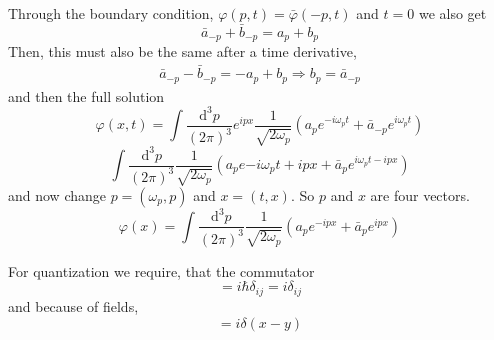 \documentclass[]{scrartcl}
\begin{document}
Through the boundary condition, $\varphi(p,t) = \bar\varphi(-p,t)$ and $t = 0$ we also get
\begin{equation}
	\bar a_{-p} + \bar b_{-p} = a_p + b_p
\end{equation}
Then, this must also be the same after a time derivative,
\begin{gather}
	\bar a_{-p} - \bar b_{-p} = - a_p + b_p
	\Rightarrow b_p = \bar a_{-p}
\end{gather}
and then the full solution
\begin{equation}
	\varphi(x,t) = \int \frac{\text{d}^3p}{(2\pi)^3} e^{ipx}\frac{1}{\sqrt{2\omega_p}}\left(a_pe^{-i\omega_p t} + \bar a_{-p} e^{i\omega_p t}\right)
\end{equation}
\begin{equation}
	\int \frac{\text{d}^3 p}{(2\pi)^3}\frac{1}{\sqrt{2\omega_p}}\left(a_p e{-i\omega_p t + ipx} + \bar a_p e^{i\omega_p t - ipx}\right)
\end{equation}
and now change $p = (\omega_p, p)$ and $x = (t, x)$. So $p$ and $x$ are four vectors.
\begin{equation}
	\varphi(x) = \int \frac{\text{d}^3 p}{(2\pi)^3} \frac{1}{\sqrt{2\omega_p}}\left(a_p e^{-ipx} + \bar a_p e^{ipx}\right)
\end{equation}

For quantization we require, that the commutator
\begin{equation}
	[q_i, p_j] = i\hbar\delta_{ij} = i\delta_{ij}
\end{equation}
and because of fields,
\begin{equation}
	[\varphi(x), \pi(y)] = i\delta(x-y)
\end{equation}
\end{document}
